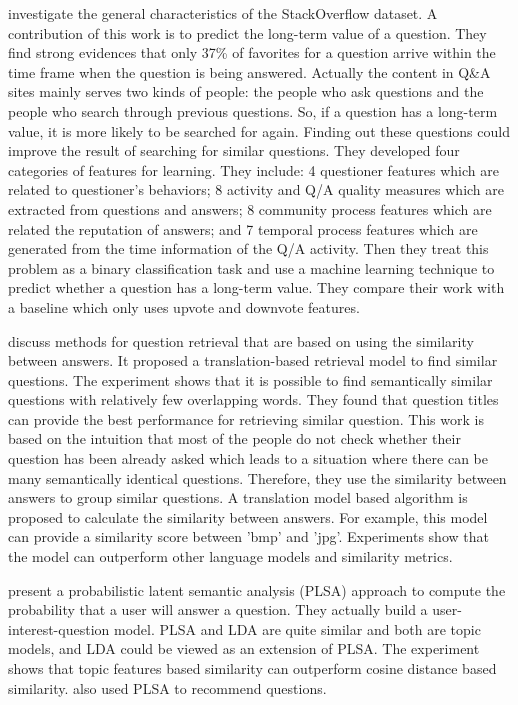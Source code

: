 \cite{anderson2012discovering} investigate the general characteristics of the StackOverflow dataset. A contribution of this work is to predict the long-term value of a question. They find strong evidences that only 37\% of favorites for a question arrive within the time frame when the question is being answered. Actually the content in Q\&A sites mainly serves two kinds of people: the people who ask questions and the people who search through previous questions. So, if a question has a long-term value, it is more likely to be searched for again. Finding out these questions could improve the result of searching for similar questions. 
They developed four categories of features for learning. They include: 4 questioner features which are related to questioner's behaviors; 8 activity and Q/A quality measures which are extracted from questions and answers; 8 community process features which are related the reputation of answers; and 7 temporal process features which are generated from the time information of the Q/A activity.
Then they treat this problem as a binary classification task and use a machine learning technique to predict whether a question has a long-term value. They compare their work with a baseline which only uses upvote and downvote features. 

\cite{chp2jeon2005finding}
discuss methods for question retrieval that are based on using the similarity between answers. It proposed a translation-based retrieval model to find similar questions. The experiment shows that it is possible to find semantically similar questions with relatively few overlapping words.
They found that question titles can provide the best performance for retrieving similar question. This work is based on the intuition that most of the people do not check whether their question has been already asked which leads to a situation where there can be many semantically identical questions. Therefore, they use the similarity between answers to group similar questions. A translation model based algorithm is proposed to calculate the similarity between answers. For example, this model can provide a similarity score between 'bmp' and 'jpg'. Experiments show that the model can outperform other language models and similarity metrics. 

\cite{chp2Qu:2009:WWW:PLSA:SimlarQ} 
present a probabilistic latent semantic analysis (PLSA) approach to compute the probability that a user will answer a question. 
They actually build a user-interest-question model. PLSA and LDA are quite similar and both are topic models, and LDA could be viewed as an extension of PLSA. The experiment shows that topic features based similarity can outperform cosine distance based similarity. \cite{chp2Wu:2008:PLSA:SimlarQ} also used PLSA to recommend questions.


